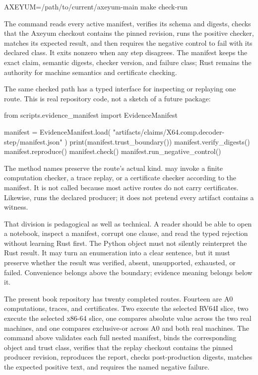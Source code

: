 \begin{codelisting}[language={},caption={Replay every active evidence route and control}]
AXEYUM=/path/to/current/axeyum-main make check-run
\end{codelisting}

The command reads every active manifest, verifies its schema and digests,
checks that the Axeyum checkout contains the pinned revision, runs the positive
checker, matches its expected result, and then requires the negative control
to fail with its declared class. It exits nonzero when any step disagrees. The
manifest keeps the exact claim, semantic digests, checker version, and failure
class; Rust remains the authority for machine semantics and certificate
checking.

The same checked path has a typed interface for inspecting or replaying one
route. This is real repository code, not a sketch of a future package:

\begin{codelisting}[language=Python,caption={Inspect and replay one evidence manifest}]
from scripts.evidence_manifest import EvidenceManifest

manifest = EvidenceManifest.load(
    "artifacts/claims/X64.comp.decoder-step/manifest.json"
)
print(manifest.trust_boundary())
manifest.verify_digests()
manifest.reproduce()
manifest.check()
manifest.run_negative_control()
\end{codelisting}

The method names preserve the route's actual kind.  may invoke a
finite computation checker, a trace replay, or a certificate checker according
to the manifest. It is not called  because most
active routes do not carry certificates. Likewise,  runs the
declared producer; it does not pretend every artifact contains a witness.

That division is pedagogical as well as technical. A reader should be able to
open a notebook, inspect a manifest, corrupt one clause, and read the typed
rejection without learning Rust first. The Python object must not silently
reinterpret the Rust result. It may turn an enumeration into a clear sentence,
but it must preserve whether the result was verified, absent, unsupported,
exhausted, or failed. Convenience belongs above the boundary; evidence meaning
belongs below it.

The present book repository has twenty completed routes. Fourteen are A0
computations, traces, and certificates. Two execute the selected RV64I slice,
two execute the selected x86-64 slice, one compares absolute value across the
two real machines, and one compares exclusive-or across A0 and both real
machines. The command above validates each full nested
manifest, binds the corresponding object and trust class, verifies that the
replay checkout contains the pinned producer revision, reproduces the report,
checks post-production digests, matches the expected positive text, and
requires the named negative failure.

